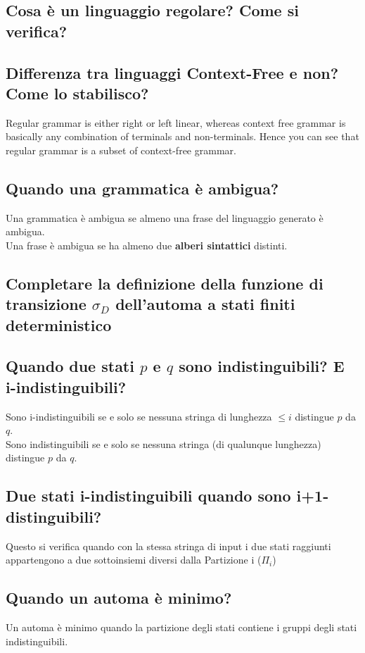 \documentclass[12pt]{article}
\begin{document}
\subsection{Cosa è un linguaggio regolare? Come si verifica?}
\subsection{Differenza tra linguaggi Context-Free e non? Come lo stabilisco?}
Regular grammar is either right or left linear, whereas context free grammar is basically any combination of terminals and non-terminals. 
Hence you can see that regular grammar is a subset of context-free grammar.
\subsection{Quando una grammatica è ambigua?}
Una grammatica è ambigua se almeno una frase del linguaggio generato è ambigua.\\
Una frase è ambigua se ha almeno due \textbf{alberi sintattici} distinti.
\subsection{Completare la definizione della funzione di transizione $\sigma_D$ dell'automa a stati finiti deterministico}
\subsection{Quando due stati $p$ e $q$ sono indistinguibili? E i-indistinguibili?}
Sono i-indistinguibili se e solo se nessuna stringa di lunghezza $\le i$ distingue $p$ da $q$.\\
Sono indistinguibili se e solo se nessuna stringa (di qualunque lunghezza) distingue $p$ da $q$.
\subsection{Due stati i-indistinguibili quando sono i+1-distinguibili?}
Questo si verifica quando con la stessa stringa di input i due stati raggiunti appartengono a due sottoinsiemi diversi dalla Partizione i ($\Pi_i$)
\subsection{Quando un automa è minimo?}
Un automa è minimo quando la partizione degli stati contiene i gruppi degli stati indistinguibili.
\end{document}

